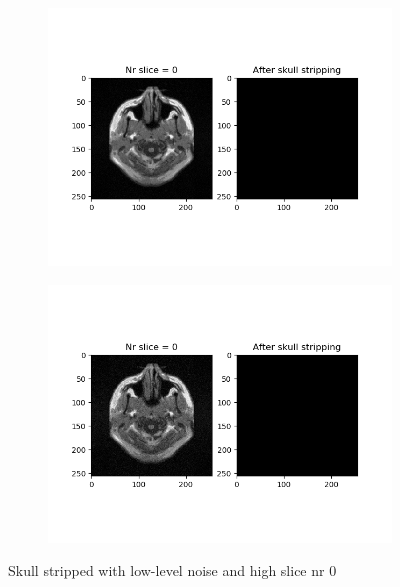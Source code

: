 \begin{figure}[H]
	\centering
	\begin{subfigure}[b]{0.35\linewidth}
		\includegraphics[scale=0.35]{figures/Module_08/M8_1.png}
	\end{subfigure}
		\begin{subfigure}[b]{0.35\linewidth}
		\includegraphics[scale=0.35]{figures/Module_08/M8_n1.png}
	\end{subfigure}
	\caption{Skull stripped with low-level noise and high slice nr 0}
	\label{fig:figures/m08_1}
\end{figure}

